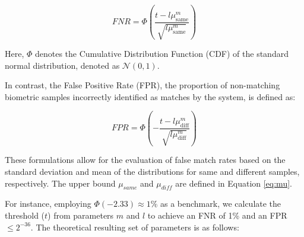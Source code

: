 \begin{equation}
    \label{eq:fnr}
    FNR = \Phi\left( \frac{t - l\mu_{\text{same}}^m}{\sqrt{l\mu_{\text{same}}^m}} \right)
\end{equation}

Here, \(\Phi\) denotes the Cumulative Distribution Function (CDF) of the standard normal distribution, denoted as \(\mathcal{N}(0, 1)\).

In contrast, the False Positive Rate (FPR), the proportion of non-matching biometric samples incorrectly identified as matches by the system, is defined as:

\begin{equation}
    \label{eq:fpr}
    FPR = \Phi\left(- \frac{t - l\mu_{\text{diff}}^m}{\sqrt{l\mu_{\text{diff}}^m}} \right)
\end{equation}

These formulations allow for the evaluation of false match rates based on the standard deviation and mean of the distributions for same and different samples, respectively. The upper bound \(\mu_{same}\) and \(\mu_{diff}\) are defined in Equation \ref{eq:mu}.

For instance, employing \(\Phi(-2.33) \approx 1\%\) as a benchmark, we calculate the threshold (\(t\)) from parameters \(m\) and \(l\) to achieve an FNR of 1\% and an FPR \(\leq 2^{-36} \). The theoretical resulting set of parameters is as follows: 

